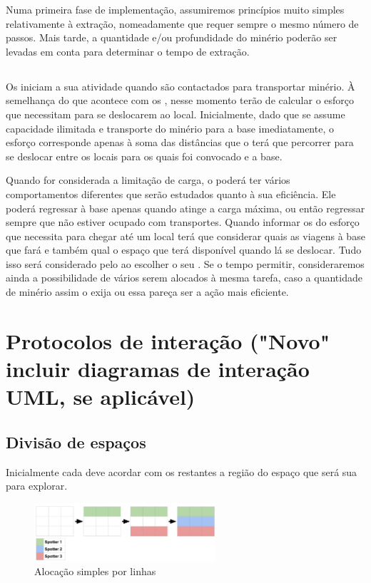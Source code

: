 \documentclass[12pt]{report}
\begin{document}
Numa primeira fase de implementação, assumiremos princípios muito simples relativamente à extração, nomeadamente que requer sempre o mesmo número de passos. Mais tarde, a quantidade e/ou profundidade do minério poderão ser levadas em conta para determinar o tempo de extração.

\subsection{\Transporter}
Os \transporters iniciam a sua atividade quando são contactados para transportar minério. À semelhança do que acontece com os \producers, nesse momento terão de calcular o esforço que necessitam para se deslocarem ao local. Inicialmente, dado que se assume capacidade ilimitada e transporte do minério para a base imediatamente, o esforço corresponde apenas à soma das distâncias que o \transporter terá que percorrer para se deslocar entre os locais para os quais foi convocado e a base. 

Quando for considerada a limitação de carga, o \transporter poderá ter vários comportamentos diferentes que serão estudados quanto à sua eficiência. Ele poderá regressar à base apenas quando atinge a carga máxima, ou então regressar sempre que não estiver ocupado com transportes. Quando informar os \producers do esforço que necessita para chegar até um local terá que considerar quais as viagens à base que fará e também qual o espaço que terá disponível quando lá se deslocar. Tudo isso será considerado pelo \producer ao escolher o seu \transporter. Se o tempo permitir, consideraremos ainda a possibilidade de vários \transporters serem alocados à mesma tarefa, caso a quantidade de minério assim o exija ou essa pareça ser a ação mais eficiente.

\section{Protocolos de interação ("Novo" incluir diagramas de interação UML, se aplicável)}

\subsection{Divisão de espaços}
Inicialmente cada \spotter deve acordar com os restantes a região do espaço que será sua para explorar. 

\begin{figure}[h]
	\centering
	\includegraphics[width=0.6\textwidth]{spotter-spaces}
	\caption{Alocação simples por linhas}
	\label{spotter-spaces}
\end{figure}
\end{document}
